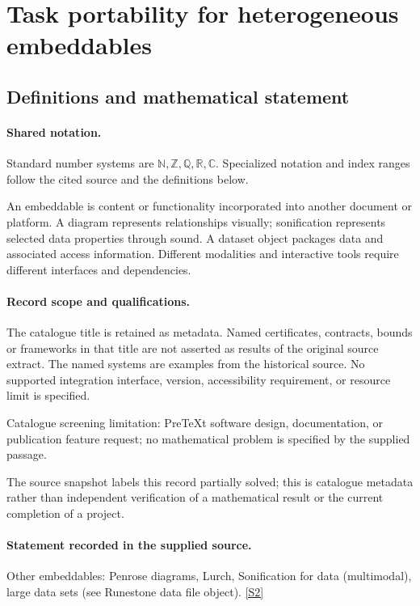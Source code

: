 \documentclass[11pt]{article}
\newcommand{\sref}[2]{\hyperlink{source:#1:#2}{[S#2]}}
\begin{document}
\section{Task portability for heterogeneous embeddables}\label{statement}

\subsection{Definitions and mathematical statement}

\paragraph{Shared notation.}Standard number systems are $\mathbb N,\mathbb Z,\mathbb Q,\mathbb R,\mathbb C$. Specialized notation and index ranges follow the cited source and the definitions below.


An embeddable is content or functionality incorporated into another document or platform. A diagram represents relationships visually; sonification represents selected data properties through sound. A dataset object packages data and associated access information. Different modalities and interactive tools require different interfaces and dependencies.
\paragraph{Record scope and qualifications.}
The catalogue title is retained as metadata. Named certificates, contracts, bounds or frameworks in that title are not asserted as results of the original source extract.
The named systems are examples from the historical source. No supported integration interface, version, accessibility requirement, or resource limit is specified.

Catalogue screening limitation: PreTeXt software design, documentation, or publication feature request; no mathematical problem is specified by the supplied passage.

The source snapshot labels this record partially solved; this is catalogue metadata rather than independent verification of a mathematical result or the current completion of a project.
\paragraph{Statement recorded in the supplied source.}
Other embeddables: Penrose diagrams, Lurch, Sonification for data (multimodal), large data sets (see Runestone data file object). \sref{statement}{2}
\end{document}
